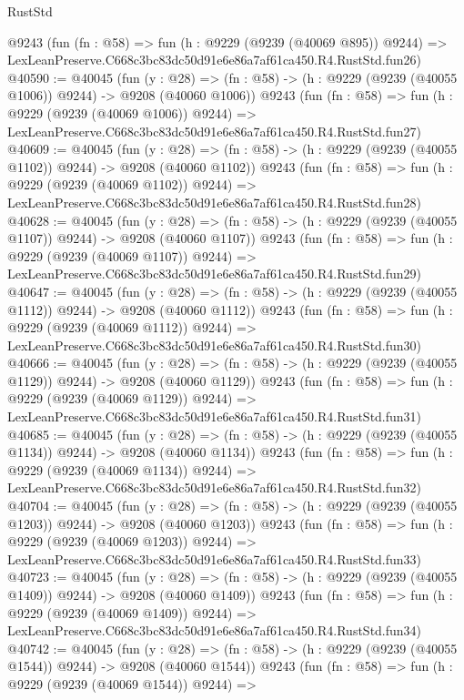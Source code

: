 \begin{lexlean}{RustStd}
\begin{coremodule}
    @9243
    (fun (fn : @58) =>
    fun (h : @9229 (@9239 (@40069 @895)) @9244) =>
    LexLeanPreserve.C668c3bc83dc50d91e6e86a7af61ca450.R4.RustStd.fun26)
@40590 := @40045
    (fun (y : @28) =>
    (fn : @58) -> (h : @9229 (@9239 (@40055 @1006)) @9244) -> @9208 (@40060 @1006))
    @9243
    (fun (fn : @58) =>
    fun (h : @9229 (@9239 (@40069 @1006)) @9244) =>
    LexLeanPreserve.C668c3bc83dc50d91e6e86a7af61ca450.R4.RustStd.fun27)
@40609 := @40045
    (fun (y : @28) =>
    (fn : @58) -> (h : @9229 (@9239 (@40055 @1102)) @9244) -> @9208 (@40060 @1102))
    @9243
    (fun (fn : @58) =>
    fun (h : @9229 (@9239 (@40069 @1102)) @9244) =>
    LexLeanPreserve.C668c3bc83dc50d91e6e86a7af61ca450.R4.RustStd.fun28)
@40628 := @40045
    (fun (y : @28) =>
    (fn : @58) -> (h : @9229 (@9239 (@40055 @1107)) @9244) -> @9208 (@40060 @1107))
    @9243
    (fun (fn : @58) =>
    fun (h : @9229 (@9239 (@40069 @1107)) @9244) =>
    LexLeanPreserve.C668c3bc83dc50d91e6e86a7af61ca450.R4.RustStd.fun29)
@40647 := @40045
    (fun (y : @28) =>
    (fn : @58) -> (h : @9229 (@9239 (@40055 @1112)) @9244) -> @9208 (@40060 @1112))
    @9243
    (fun (fn : @58) =>
    fun (h : @9229 (@9239 (@40069 @1112)) @9244) =>
    LexLeanPreserve.C668c3bc83dc50d91e6e86a7af61ca450.R4.RustStd.fun30)
@40666 := @40045
    (fun (y : @28) =>
    (fn : @58) -> (h : @9229 (@9239 (@40055 @1129)) @9244) -> @9208 (@40060 @1129))
    @9243
    (fun (fn : @58) =>
    fun (h : @9229 (@9239 (@40069 @1129)) @9244) =>
    LexLeanPreserve.C668c3bc83dc50d91e6e86a7af61ca450.R4.RustStd.fun31)
@40685 := @40045
    (fun (y : @28) =>
    (fn : @58) -> (h : @9229 (@9239 (@40055 @1134)) @9244) -> @9208 (@40060 @1134))
    @9243
    (fun (fn : @58) =>
    fun (h : @9229 (@9239 (@40069 @1134)) @9244) =>
    LexLeanPreserve.C668c3bc83dc50d91e6e86a7af61ca450.R4.RustStd.fun32)
@40704 := @40045
    (fun (y : @28) =>
    (fn : @58) -> (h : @9229 (@9239 (@40055 @1203)) @9244) -> @9208 (@40060 @1203))
    @9243
    (fun (fn : @58) =>
    fun (h : @9229 (@9239 (@40069 @1203)) @9244) =>
    LexLeanPreserve.C668c3bc83dc50d91e6e86a7af61ca450.R4.RustStd.fun33)
@40723 := @40045
    (fun (y : @28) =>
    (fn : @58) -> (h : @9229 (@9239 (@40055 @1409)) @9244) -> @9208 (@40060 @1409))
    @9243
    (fun (fn : @58) =>
    fun (h : @9229 (@9239 (@40069 @1409)) @9244) =>
    LexLeanPreserve.C668c3bc83dc50d91e6e86a7af61ca450.R4.RustStd.fun34)
@40742 := @40045
    (fun (y : @28) =>
    (fn : @58) -> (h : @9229 (@9239 (@40055 @1544)) @9244) -> @9208 (@40060 @1544))
    @9243
    (fun (fn : @58) =>
    fun (h : @9229 (@9239 (@40069 @1544)) @9244) =>

\end{coremodule}
\end{lexlean}
